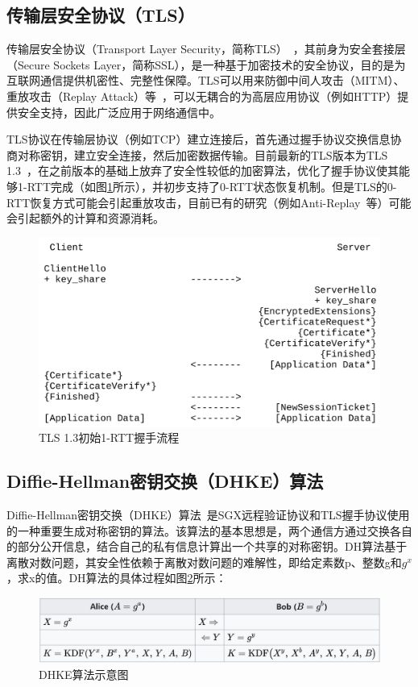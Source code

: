 \subsection{传输层安全协议（TLS）}

传输层安全协议（Transport Layer Security，简称TLS）~\cite{8446}，其前身为安全套接层（Secure Sockets Layer，简称SSL），是一种基于加密技术的安全协议，目的是为互联网通信提供机密性、完整性保障。TLS可以用来防御中间人攻击（MITM）、重放攻击（Replay Attack）等~\cite{8446}，可以无耦合的为高层应用协议（例如HTTP）提供安全支持，因此广泛应用于网络通信中。

TLS协议在传输层协议（例如TCP）建立连接后，首先通过握手协议交换信息协商对称密钥，建立安全连接，然后加密数据传输。目前最新的TLS版本为TLS 1.3~\cite{8446}，在之前版本的基础上放弃了安全性较低的加密算法，优化了握手协议使其能够1-RTT完成（如图\ref{fig:1-rtt}所示），并初步支持了0-RTT状态恢复机制。但是TLS的0-RTT恢复方式可能会引起重放攻击，目前已有的研究（例如Anti-Replay~\cite{8446}等）可能会引起额外的计算和资源消耗。

\begin{figure}[!ht]
    \centering
    \includegraphics[width=.7\textwidth]{figures/1-RTT.png}
    \caption{TLS 1.3初始1-RTT握手流程}
    \label{fig:1-rtt}
\end{figure}

\subsection{Diffie-Hellman密钥交换（DHKE）算法}

Diffie-Hellman密钥交换（DHKE）算法~\cite{Diffie1976NewDI}是SGX远程验证协议和TLS握手协议使用的一种重要生成对称密钥的算法。该算法的基本思想是，两个通信方通过交换各自的部分公开信息，结合自己的私有信息计算出一个共享的对称密钥。DH算法基于离散对数问题，其安全性依赖于离散对数问题的难解性，即给定素数p、整数g和$g^x$，求x的值。DH算法的具体过程如图\ref{fig:dhke}所示：

\begin{figure}[!ht]
    \centering
    \includegraphics[width=.7\textwidth]{figures/DHKE.png}
    \caption{DHKE算法示意图}
    \label{fig:dhke}
\end{figure}


